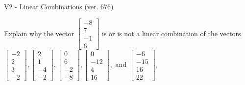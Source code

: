 \begin{exercise}
  \begin{exerciseTitle}V2 - Linear Combinations (ver. 676)\end{exerciseTitle}
  \begin{exerciseStatement}
    Explain why the vector \(\left[\begin{array}{c}
-8 \\
7 \\
-1 \\
6
\end{array}\right]\)  is or is not a linear 
	combination of the vectors \(\left[\begin{array}{c}
-2 \\
2 \\
3 \\
-2
\end{array}\right] , \left[\begin{array}{c}
2 \\
1 \\
-4 \\
-2
\end{array}\right] , \left[\begin{array}{c}
0 \\
6 \\
-2 \\
-8
\end{array}\right] , \left[\begin{array}{c}
0 \\
-12 \\
4 \\
16
\end{array}\right] , \text{ and } \left[\begin{array}{c}
-6 \\
-15 \\
16 \\
22
\end{array}\right]\).
	



\end{exerciseStatement}
\end{exercise}
